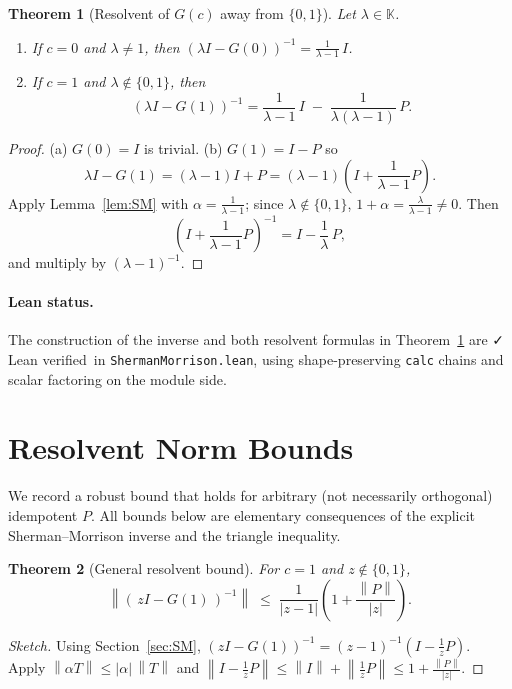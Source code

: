 \documentclass[11pt]{article}
\newtheorem{theorem}{Theorem}[section]
\theoremstyle{definition}
\newcommand{\K}{\mathbb{K}}
\newcommand{\norm}[1]{\left\lVert #1\right\rVert}
\newcommand{\leanok}{\textsf{\small \textcolor{green!60!black}{✓ Lean verified}}}
\begin{document}
\begin{theorem}[Resolvent of $G(c)$ away from $\{0,1\}$]\label{thm:SM-resolvent}
Let $\lambda\in\K$.
\begin{enumerate}
\item If $c=0$ and $\lambda\neq 1$, then $(\lambda I - G(0))^{-1}=\frac{1}{\lambda-1}\,I$.
\item If $c=1$ and $\lambda\notin\{0,1\}$, then
\[
(\lambda I - G(1))^{-1}
= \frac{1}{\lambda-1}\,I \;-\; \frac{1}{\lambda(\lambda-1)}\,P.
\]
\end{enumerate}
\end{theorem}

\begin{proof}
(a) $G(0)=I$ is trivial. (b) $G(1)=I-P$ so
\[
\lambda I - G(1)=(\lambda-1)I+P=(\lambda-1)\left(I + \frac{1}{\lambda-1}P\right).
\]
Apply Lemma~\ref{lem:SM} with $\alpha=\frac{1}{\lambda-1}$; since $\lambda\notin\{0,1\}$, $1+\alpha=\frac{\lambda}{\lambda-1}\neq 0$. Then
\[
\left(I+\frac{1}{\lambda-1}P\right)^{-1}
= I - \frac{1}{\lambda}\,P,
\]
and multiply by $(\lambda-1)^{-1}$.
\end{proof}

\paragraph{Lean status.} The construction of the inverse and both resolvent formulas in Theorem~\ref{thm:SM-resolvent} are \leanok\ in \texttt{ShermanMorrison.lean}, using shape-preserving \texttt{calc} chains and scalar factoring on the module side.

\section{Resolvent Norm Bounds}\label{sec:norms}

We record a robust bound that holds for arbitrary (not necessarily orthogonal) idempotent $P$.
All bounds below are elementary consequences of the explicit Sherman--Morrison inverse and the triangle inequality.

\begin{theorem}[General resolvent bound]\label{thm:bound-general}
For $c=1$ and $z\notin\{0,1\}$,
\[
\norm{(\,zI - G(1)\,)^{-1}} \;\le\; \frac{1}{|z-1|}\left(1 + \frac{\norm{P}}{|z|}\right).
\]
\end{theorem}

\begin{proof}[Sketch]
Using Section~\ref{sec:SM}, $(zI - G(1))^{-1}=(z-1)^{-1}\left(I - \frac{1}{z}P\right)$. Apply $\norm{\alpha T}\le |\alpha|\,\norm{T}$ and $\norm{I - \frac{1}{z}P}\le \norm{I} + \norm{\frac{1}{z}P}\le 1 + \frac{\norm{P}}{|z|}$.
\end{proof}
\end{document}
